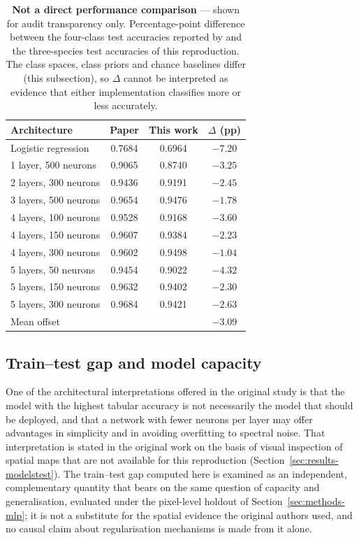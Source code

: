 \documentclass[10pt,twocolumn,a4paper]{article}
\begin{document}
\begin{table}[!t]
\centering
\caption{\textbf{Not a direct performance comparison} --- shown for audit transparency only.
Percentage-point difference between the four-class test accuracies reported by
\citet{monterrubio2025} and the three-species test accuracies of this reproduction. The class
spaces, class priors and chance baselines differ (this subsection), so $\Delta$ cannot be interpreted
as evidence that either implementation classifies more or less accurately.}
\label{tab:diff}
\footnotesize
\setlength{\tabcolsep}{4pt}
\begin{tabular}{l c c c}
\toprule
\textbf{Architecture} & \textbf{Paper} & \textbf{This work} & \textbf{$\Delta$ (pp)} \\
\midrule
Logistic regression & 0.7684 & 0.6964 & $-7.20$ \\
1 layer, 500 neurons & 0.9065 & 0.8740 & $-3.25$ \\
2 layers, 300 neurons & 0.9436 & 0.9191 & $-2.45$ \\
3 layers, 500 neurons & 0.9654 & 0.9476 & $-1.78$ \\
4 layers, 100 neurons & 0.9528 & 0.9168 & $-3.60$ \\
4 layers, 150 neurons & 0.9607 & 0.9384 & $-2.23$ \\
4 layers, 300 neurons & 0.9602 & 0.9498 & $-1.04$ \\
5 layers, 50 neurons & 0.9454 & 0.9022 & $-4.32$ \\
5 layers, 150 neurons & 0.9632 & 0.9402 & $-2.30$ \\
5 layers, 300 neurons & 0.9684 & 0.9421 & $-2.63$ \\
\midrule
\multicolumn{3}{l}{Mean offset} & $-3.09$ \\
\bottomrule
\end{tabular}
\end{table}

\subsection{Train--test gap and model capacity}
\label{sec:gap}

One of the architectural interpretations offered in the original study is that the model with the
highest tabular accuracy is not necessarily the model that should be deployed, and that a network
with fewer neurons per layer may offer advantages in simplicity and in avoiding overfitting to
spectral noise. That interpretation is stated in the original work on the basis of visual inspection
of spatial maps that are not available for this reproduction
(Section~\ref{sec:results-modelstest}). The train--test gap
computed here is examined as an independent, complementary quantity that bears on the same question
of capacity and generalisation, evaluated under the pixel-level holdout of
Section~\ref{sec:methods-mlp}; it is not a
substitute for the spatial evidence the original authors used, and no causal claim about
regularisation mechanisms is made from it alone.
\end{document}
